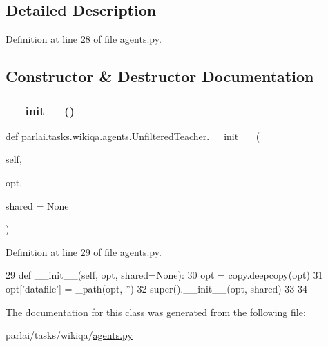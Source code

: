\subsection{Detailed Description}


Definition at line 28 of file agents.\+py.



\subsection{Constructor \& Destructor Documentation}
\mbox{\label{classparlai_1_1tasks_1_1wikiqa_1_1agents_1_1UnfilteredTeacher_a3f69b4069d4702ca92b2ce728f0e4ca4}} 
\subsubsection{\texorpdfstring{\+\_\+\+\_\+init\+\_\+\+\_\+()}{\_\_init\_\_()}}
{\footnotesize\ttfamily def parlai.\+tasks.\+wikiqa.\+agents.\+Unfiltered\+Teacher.\+\_\+\+\_\+init\+\_\+\+\_\+ (\begin{DoxyParamCaption}\item[{}]{self,  }\item[{}]{opt,  }\item[{}]{shared = {\ttfamily None} }\end{DoxyParamCaption})}



Definition at line 29 of file agents.\+py.


\begin{DoxyCode}
29     \textcolor{keyword}{def }\_\_init\_\_(self, opt, shared=None):
30         opt = copy.deepcopy(opt)
31         opt[\textcolor{stringliteral}{'datafile'}] = \_path(opt, \textcolor{stringliteral}{''})
32         super().\_\_init\_\_(opt, shared)
33 
34 
\end{DoxyCode}


The documentation for this class was generated from the following file\+:\begin{DoxyCompactItemize}
\item 
parlai/tasks/wikiqa/\hyperlink{parlai_2tasks_2wikiqa_2agents_8py}{agents.\+py}\end{DoxyCompactItemize}
